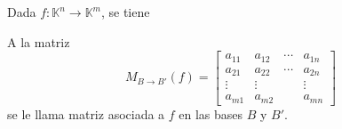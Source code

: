 \documentclass[12pt]{article}
\begin{document}
Dada $f:\mathbb{K}^n\longrightarrow\mathbb{K}^m$, se tiene 
\begin{center}
\end{center}
A la matriz \[M_{B\rightarrow B'}(f)=\begin{bmatrix}
a_{11} & a_{12} & \cdots & a_{1n} \\ 
a_{21} & a_{22} & \cdots & a_{2n} \\ 
\vdots & \vdots &  & \vdots \\ 
a_{m1} & a_{m2} &  & a_{mn}
\end{bmatrix} \]
se le llama matriz asociada a $f$ en las bases $B$ y $B'$.
\end{document}
